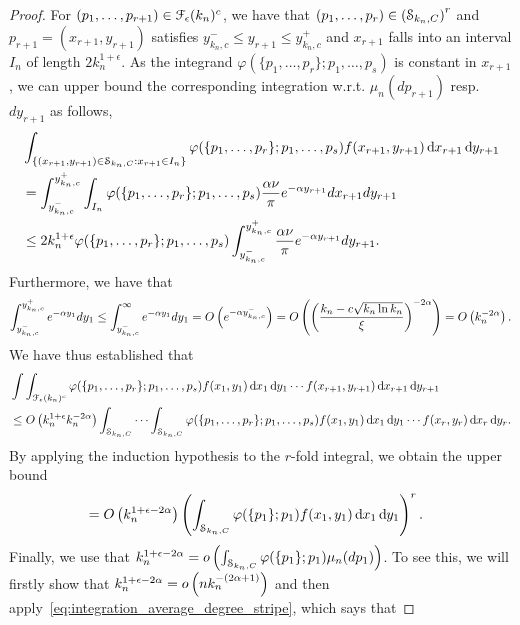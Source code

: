 \begin{proof}
For $(p_1,\dots,p_{r+1})\in \mathcal{F}_\epsilon(k_n)^c$, we have that $(p_1,\dots,p_r) \in \left(\mathcal{S}_{k_n,C}\right)^r$ and $p_{r+1}=(x_{r+1},y_{r+1})$ satisfies $y_{k_n,c}^-\leq y_{r+1}\leq y_{k_n,c}^+$ and $x_{r+1}$ falls into an interval $I_n$ of length $2k_n^{1+\epsilon}$.
As the integrand $\varphi(\{p_1,\dots,p_r\};p_1,\dots,p_s)$ is constant in $x_{r+1}$, we can upper bound the corresponding integration  w.r.t. $\mu_n(dp_{r+1})$ resp. $dy_{r+1}$ as follows,
\begin{align*}
	&\int_{\{(x_{r+1},y_{r+1})\in\mathcal{S}_{k_n,C}: x_{r+1}\in I_n\}} \varphi(\{p_1,\dots,p_r\};p_1,\dots,p_s) 
		f(x_{r+1},y_{r+1})\operatorname{\mathrm{d}\hspace{-2pt}} x_{r+1} \operatorname{\mathrm{d}\hspace{-2pt}} y_{r+1} \\
	&= \int_{y_{k_n,c}^-}^{y_{k_n,c}^+} \int_{I_n} \varphi(\{p_1,\dots,p_r\};p_1,\dots,p_s)\frac{\alpha \nu}{\pi} e^{-\alpha y_{r+1}} dx_{r+1}dy_{r+1} \\
	&\leq 2k_n^{1+\epsilon} \varphi(\{p_1,\dots,p_r\};p_1,\dots,p_s)\int_{y_{k_n,c}^-}^{y_{k_n,c}^+}  \frac{\alpha \nu}{\pi} e^{-\alpha y_{r+1}} dy_{r+1}.
\end{align*}
Furthermore, we have that
\begin{align*}
\int_{y_{k_n,c}^-}^{y_{k_n,c}^+} e^{-\alpha y_1}dy_1 \leq \int_{y_{k_n,c}^-}^\infty e^{-\alpha y_1}dy_1 = O\left(e^{-\alpha y_{k_n,c}^-}\right) = O\left(\left( \frac{k_n-c\sqrt{k_n\ln k_n}}{\xi}\right)^{-2\alpha}\right) = O\left(k_n^{-2\alpha}\right).
\end{align*}
We have thus established that
\begin{align*}
	&\int \int_{\mathcal{F}_\epsilon(k_n)^c} \varphi(\{p_1,\dots,p_r\};p_1,\dots,p_s)
		f(x_1,y_1) \operatorname{\mathrm{d}\hspace{-2pt}} x_1 \operatorname{\mathrm{d}\hspace{-2pt}} y_1 \cdots f(x_{r+1},y_{r+1})\operatorname{\mathrm{d}\hspace{-2pt}} x_{r+1} \operatorname{\mathrm{d}\hspace{-2pt}} y_{r+1}\\
	&\leq O\left(k_n^{1+\epsilon} k_n^{-2\alpha}\right)\int_{\mathcal{S}_{k_n,C}} \cdots \int_{\mathcal{S}_{k_n,C}} 
		\varphi(\{p_1,\dots,p_r\};p_1,\dots,p_s) f(x_1,y_1) \operatorname{\mathrm{d}\hspace{-2pt}} x_1 \operatorname{\mathrm{d}\hspace{-2pt}} y_1 \cdots f(x_{r},y_{r})\operatorname{\mathrm{d}\hspace{-2pt}} x_{r} \operatorname{\mathrm{d}\hspace{-2pt}} y_{r}.
\end{align*}
By applying the induction hypothesis to the $r$-fold integral, we obtain the upper bound
\begin{align}\label{eq:indhyp}
&=O\left(k_n^{1+\epsilon-2\alpha}\right)\left(\int_{\mathcal{S}_{k_n,C}} \varphi(\{p_1\};p_1) f(x_1,y_1) \operatorname{\mathrm{d}\hspace{-2pt}} x_1 \operatorname{\mathrm{d}\hspace{-2pt}} y_1\right)^r .
\end{align}
Finally, we use that $k_n^{1+\epsilon-2\alpha} = o\left(\int_{\mathcal{S}_{k_n,C}} \varphi(\{p_1\};p_1)\mu_n(dp_1)\right)$. To see this, we will firstly show that $k_n^{1+\epsilon-2\alpha} = o\left(nk_n^{-(2\alpha+1)}\right)$ and then apply~\eqref{eq:integration_average_degree_stripe}, which says that

\end{proof}
